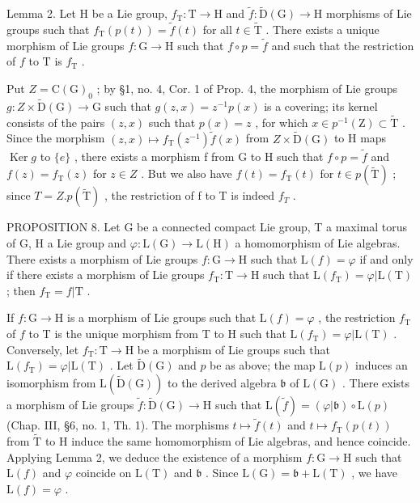 Lemma 2. Let H be a Lie group, \(f_{\mathrm{T}}: \mathrm{T} \to \mathrm{H}\) and \(\tilde{f}: \tilde{\mathrm{D}}(\mathrm{G}) \to \mathrm{H}\) morphisms of Lie groups such that \(f_{\mathrm{T}}(p(t)) = \tilde{f}(t)\) for all \(t \in \tilde{\mathrm{T}}\) . There exists a unique morphism of Lie groups \(f: \mathrm{G} \to \mathrm{H}\) such that \(f \circ p = \tilde{f}\) and such that the restriction of \(f\) to \(\mathrm{T}\) is \(f_{\mathrm{T}}\) .

Put \(Z = \mathrm{C}(\mathrm{G})_{0}\) ; by §1, no. 4, Cor. 1 of Prop. 4, the morphism of Lie groups \(g: Z \times \tilde{\mathrm{D}}(\mathrm{G}) \to \mathrm{G}\) such that \(g(z, x) = z^{-1} p(x)\) is a covering; its kernel consists of the pairs \((z, x)\) such that \(p(x) = z\) , for which \(x \in p^{-1}(\mathrm{Z}) \subset \tilde{\mathrm{T}}\) . Since the morphism \((z, x) \mapsto f_{\mathrm{T}}(z^{-1}) \tilde{f}(x)\) from \(Z \times \tilde{\mathrm{D}}(\mathrm{G})\) to H maps \(\operatorname{Ker} g\) to \(\{e\}\) , there exists a morphism f from G to H such that \(f \circ p = \tilde{f}\) and \(f(z) = f_{\mathrm{T}}(z)\) for \(z \in Z\) . But we also have \(f(t) = f_{\mathrm{T}}(t)\) for \(t \in p(\tilde{\mathrm{T}})\) ; since \(T = Z.p(\tilde{\mathrm{T}})\) , the restriction of f to T is indeed \(f_{T}\) .

PROPOSITION 8. Let G be a connected compact Lie group, T a maximal torus of G, H a Lie group and \(\varphi : \mathrm{L}(\mathrm{G}) \to \mathrm{L}(\mathrm{H})\) a homomorphism of Lie algebras. There exists a morphism of Lie groups \(f: \mathrm{G} \to \mathrm{H}\) such that \(\mathrm{L}(f) = \varphi\) if and only if there exists a morphism of Lie groups \(f_{\mathrm{T}}: \mathrm{T} \to \mathrm{H}\) such that \(\mathrm{L}(f_{\mathrm{T}}) = \varphi | \mathrm{L}(\mathrm{T})\) ; then \(f_{\mathrm{T}} = f | \mathrm{T}\) .

If \(f: \mathrm{G} \to \mathrm{H}\) is a morphism of Lie groups such that \(\mathrm{L}(f) = \varphi\) , the restriction \(f_{\mathrm{T}}\) of \(f\) to \(\mathrm{T}\) is the unique morphism from \(\mathrm{T}\) to \(\mathrm{H}\) such that \(\mathrm{L}(f_{\mathrm{T}}) = \varphi | \mathrm{L}(\mathrm{T})\) . Conversely, let \(f_{\mathrm{T}}: \mathrm{T} \to \mathrm{H}\) be a morphism of Lie groups such that \(\mathrm{L}(f_{\mathrm{T}}) = \varphi | \mathrm{L}(\mathrm{T})\) . Let \(\tilde{\mathrm{D}}(\mathrm{G})\) and \(p\) be as above; the map \(\mathrm{L}(p)\) induces an isomorphism from \(\mathrm{L}(\tilde{\mathrm{D}}(\mathrm{G}))\) to the derived algebra \(\mathfrak{b}\) of \(\mathrm{L}(\mathrm{G})\) . There exists a morphism of Lie groups \(\tilde{f}: \tilde{\mathrm{D}}(\mathrm{G}) \to \mathrm{H}\) such that \(\mathrm{L}(\tilde{f}) = (\varphi | \mathfrak{b}) \circ \mathrm{L}(p)\) (Chap. III, §6, no. 1, Th. 1). The morphisms \(t \mapsto \tilde{f}(t)\) and \(t \mapsto f_{\mathrm{T}}(p(t))\) from \(\tilde{\mathrm{T}}\) to \(\mathrm{H}\) induce the same homomorphism of Lie algebras, and hence coincide. Applying Lemma 2, we deduce the existence of a morphism \(f: \mathrm{G} \to \mathrm{H}\) such that \(\mathrm{L}(f)\) and \(\varphi\) coincide on \(\mathrm{L}(\mathrm{T})\) and \(\mathfrak{b}\) . Since \(\mathrm{L}(\mathrm{G}) = \mathfrak{b} + \mathrm{L}(\mathrm{T})\) , we have \(\mathrm{L}(f) = \varphi\) .

